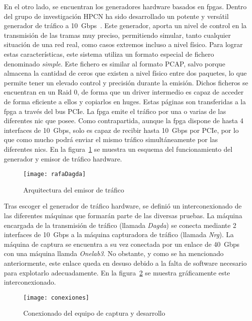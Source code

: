 En el otro lado, se encuentran los generadores hardware basados en \glspl{fpga}. Dentro del grupo de investigación HPCN ha sido desarrollado un potente y versátil generador de tráfico a 10~Gbps~\cite{zazo2014tnt10g}. Este generador, aporta un nivel de control en la transmisión de las tramas muy preciso, permitiendo simular, tanto cualquier situación de una red real, como casos extremos incluso a nivel físico.
Para lograr estas características, este sistema utiliza un formato especial de fichero denominado \textit{simple}. Este fichero es similar al formato PCAP, salvo porque almacena la cantidad de ceros que existen a nivel físico entre dos paquetes, lo que permite tener un elevado control y precisión durante la emisión. Dichos ficheros se encuentran en un Raid 0, de forma que un driver intermedio es capaz de acceder de forma eficiente a ellos y copiarlos en \glspl{huge}. Estas páginas son transferidas a la \gls{fpga} a través del bus PCIe. La \gls{fpga} emite el tráfico por una o varias de las diferentes \gls{nic} que posee. Como contrapartida, aunque la \gls{fpga} dispone de hasta 4 interfaces de 10~Gbps, solo es capaz de recibir hasta 10~Gbps por PCIe, por lo que como mucho podrá enviar el mismo tráfico simultáneamente por las diferentes \glspl{nic}. En la figura~\ref{fig:rafaDagda} se muestra un esquema del funcionamiento del generador y emisor de tráfico hardware.

\begin{figure}[!htb]
\centering
\texttt{[image: rafaDagda]}
\caption{Arquitectura del emisor de tráfico}
\label{fig:rafaDagda}
\end{figure}

Tras escoger el generador de tráfico hardware, se definió un interconexionado de las diferentes máquinas que formarán parte de las diversas pruebas. La máquina encargada de la transmisión de tráfico (llamada \textit{Dagda}) se conecta mediante 2 interfaces de 10~Gbps a la máquina capturadora de tráfico (llamada \textit{Nrg}). La máquina de captura se encuentra a su vez conectada por un enlace de 40~Gbps con una máquina llamda \textit{Onelab3}. No obstante, y como se ha mencionado anteriormente, este enlace queda en desuso debido a la falta de software necesario para explotarlo adecuadamente. En la figura~\ref{fig:conexiones} se muestra gráficamente este interconexionado.

\begin{figure}[!htb]
\centering
\texttt{[image: conexiones]}
\caption{Conexionado del equipo de captura y desarrollo}
\label{fig:conexiones}
\end{figure}

